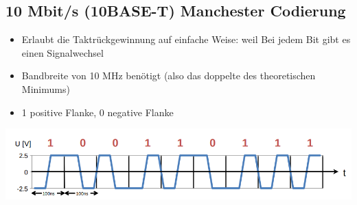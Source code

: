 \subsection{10 Mbit/s (10BASE-T) Manchester Codierung}{
    \begin{itemize}[noitemsep]
        \item Erlaubt die Taktrückgewinnung auf einfache Weise: weil Bei jedem Bit gibt es einen Signalwechsel
        \item Bandbreite von 10 MHz benötigt (also das doppelte des theoretischen Minimums)
        \item   1 positive Flanke, 0 negative Flanke
    \end{itemize}

    \includegraphics[scale=.275]{img/manchester.png}

}
